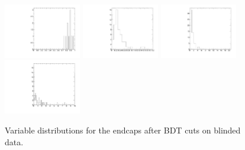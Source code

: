 \begin{figure}
  \includegraphics[width=0.3\textwidth]{Figures/AfterBDTCut_iso_Endcaps.pdf}
  \includegraphics[width=0.3\textwidth]{Figures/AfterBDTCut_docatrk_Endcaps.pdf}
  \includegraphics[width=0.3\textwidth]{Figures/AfterBDTCut_closetrk_Endcaps.pdf}
  \includegraphics[width=0.3\textwidth]{Figures/AfterBDTCut_chi2dof_Endcaps.pdf}
  \caption{Variable distributions for the endcaps after BDT cuts on blinded data.}
  \label{fig:AfterBDTCutVariablesEndcapsBlinded}
\end{figure}

